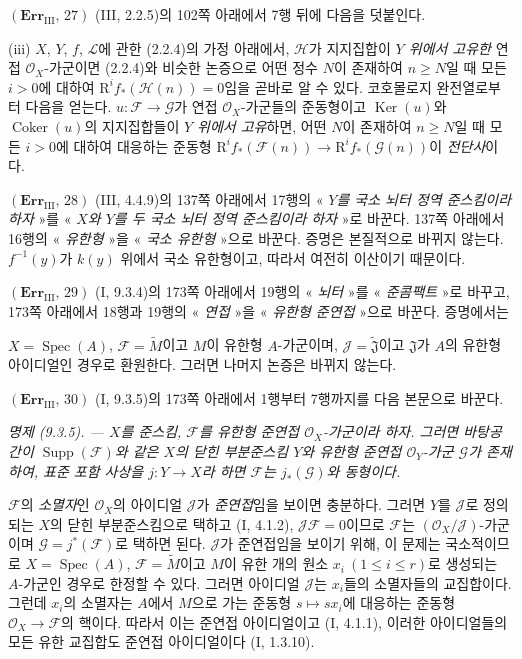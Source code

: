 \noindent\textbf{$(\mathbf{Err}_{\mathrm{III}},\,27)$}
(III, 2.2.5)의 102쪽 아래에서 7행 뒤에 다음을 덧붙인다.

(iii) $X$, $Y$, $f$, $\mathscr L$에 관한 (2.2.4)의 가정 아래에서,
$\mathscr H$가 지지집합이 \emph{$Y$ 위에서 고유한} 연접
$\mathscr O_X$-가군이면 (2.2.4)와 비슷한 논증으로 어떤 정수 $N$이
존재하여 $n\geq N$일 때 모든 $i>0$에 대하여
$\mathrm R^if_*(\mathscr H(n))=0$임을 곧바로 알 수 있다. 코호몰로지
완전열로부터 다음을 얻는다. $u:\mathscr F\to\mathscr G$가 연접
$\mathscr O_X$-가군들의 준동형이고 $\operatorname{Ker}(u)$와
$\operatorname{Coker}(u)$의 지지집합들이 \emph{$Y$ 위에서 고유}하면,
어떤 $N$이 존재하여 $n\geq N$일 때 모든 $i>0$에 대하여 대응하는
준동형
$\mathrm R^if_*(\mathscr F(n))\to\mathrm R^if_*(\mathscr G(n))$이
\emph{전단사}이다.

\noindent\textbf{$(\mathbf{Err}_{\mathrm{III}},\,28)$}
(III, 4.4.9)의 137쪽 아래에서 17행의 « \emph{$Y$를 국소 뇌터
정역 준스킴이라 하자} »를 « \emph{$X$와 $Y$를 두 국소 뇌터 정역
준스킴이라 하자} »로 바꾼다. 137쪽 아래에서 16행의
« \emph{유한형} »을 « \emph{국소 유한형} »으로 바꾼다. 증명은
본질적으로 바뀌지 않는다. $f^{-1}(y)$가 $k(y)$ 위에서 국소 유한형이고,
따라서 여전히 이산이기 때문이다.

\noindent\textbf{$(\mathbf{Err}_{\mathrm{III}},\,29)$}
(I, 9.3.4)의 173쪽 아래에서 19행의 « \emph{뇌터} »를
« \emph{준콤팩트} »로 바꾸고, 173쪽 아래에서 18행과 19행의
« \emph{연접} »을 « \emph{유한형 준연접} »으로 바꾼다. 증명에서는

$X=\operatorname{Spec}(A)$, $\mathscr F=\widetilde M$이고 $M$이 유한형
$A$-가군이며, $\mathscr J=\widetilde{\mathfrak J}$이고
$\mathfrak J$가 $A$의 유한형 아이디얼인 경우로 환원한다. 그러면
나머지 논증은 바뀌지 않는다.

\noindent\textbf{$(\mathbf{Err}_{\mathrm{III}},\,30)$}
(I, 9.3.5)의 173쪽 아래에서 1행부터 7행까지를 다음 본문으로 바꾼다.

\emph{명제 (9.3.5). --- $X$를 준스킴, $\mathscr F$를 유한형 준연접
$\mathscr O_X$-가군이라 하자. 그러면 바탕공간이
$\operatorname{Supp}(\mathscr F)$와 같은 $X$의 닫힌 부분준스킴 $Y$와
유한형 준연접 $\mathscr O_Y$-가군 $\mathscr G$가 존재하여, 표준 포함
사상을 $j:Y\to X$라 하면 $\mathscr F$는 $j_*(\mathscr G)$와 동형이다.}

$\mathscr F$의 \emph{소멸자}인 $\mathscr O_X$의 아이디얼 $\mathscr J$가
\emph{준연접}임을 보이면 충분하다. 그러면 $Y$를 $\mathscr J$로 정의되는
$X$의 닫힌 부분준스킴으로 택하고 (I, 4.1.2),
$\mathscr J\mathscr F=0$이므로 $\mathscr F$는
$(\mathscr O_X/\mathscr J)$-가군이며 $\mathscr G=j^*(\mathscr F)$로
택하면 된다. $\mathscr J$가 준연접임을 보이기 위해, 이 문제는
국소적이므로 $X=\operatorname{Spec}(A)$,
$\mathscr F=\widetilde M$이고 $M$이 유한 개의 원소
$x_i\ (1\leq i\leq r)$로 생성되는 $A$-가군인 경우로 한정할 수 있다.
그러면 아이디얼 $\mathscr J$는 $x_i$들의 소멸자들의 교집합이다. 그런데
$x_i$의 소멸자는 $A$에서 $M$으로 가는 준동형 $s\mapsto sx_i$에
대응하는 준동형 $\mathscr O_X\to\mathscr F$의 핵이다. 따라서 이는
준연접 아이디얼이고 (I, 4.1.1), 이러한 아이디얼들의 모든 유한
교집합도 준연접 아이디얼이다 (I, 1.3.10).
